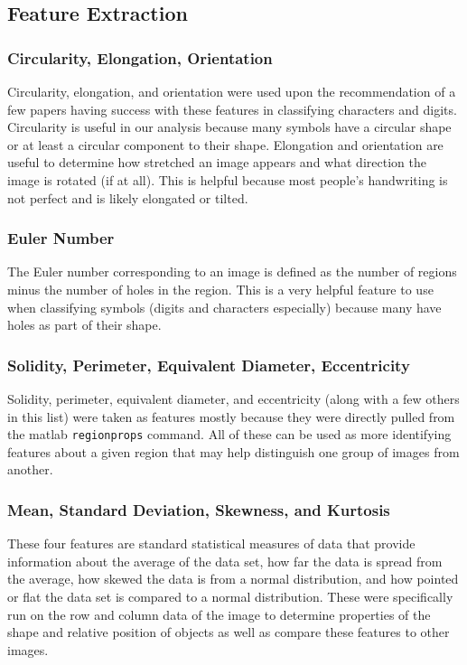 \subsection{Feature Extraction}
\subsubsection{Circularity, Elongation, Orientation}
Circularity, elongation, and orientation were used upon the recommendation of a few papers having success with these features in classifying characters and digits.  Circularity is useful in our analysis because many symbols have a circular shape or at least a circular component to their shape.  Elongation and orientation are useful to determine how stretched an image appears and what direction the image is rotated (if at all).  This is helpful because most people's handwriting is not perfect and is likely elongated or tilted.
\subsubsection{Euler Number}
The Euler number corresponding to an image is defined as the number of regions minus the number of holes in the region.  This is a very helpful feature to use when classifying symbols (digits and characters especially) because many have holes as part of their shape.
\subsubsection{Solidity, Perimeter, Equivalent Diameter, Eccentricity}
Solidity, perimeter, equivalent diameter, and eccentricity (along with a few others in this list) were taken as features mostly because they were directly pulled from the matlab \texttt{regionprops} command.  All of these can be used as more identifying features about a given region that may help distinguish one group of images from another.
\subsubsection{Mean, Standard Deviation, Skewness, and Kurtosis}
These four features are standard statistical measures of data that provide information about the average of the data set, how far the data is spread from the average, how skewed the data is from a normal distribution, and how pointed or flat the data set is compared to a normal distribution.  These were specifically run on the row and column data of the image to determine properties of the shape and relative position of objects as well as compare these features to other images.  
